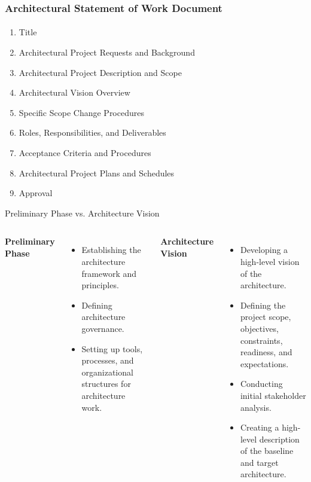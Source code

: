 \documentclass[aspectratio=169, table]{beamer}
\begin{document}
    \begin{frame}
        \frametitle{Architectural Statement of Work Document}
        \framesubtitle{\hspace{1cm}}
        \vspace{20pt}
        \begin{enumerate}
            \item Title
            \item Architectural Project Requests and Background
            \item Architectural Project Description and Scope
            \item Architectural Vision Overview
            \item Specific Scope Change Procedures
            \item Roles, Responsibilities, and Deliverables
            \item Acceptance Criteria and Procedures
            \item Architectural Project Plans and Schedules
            \item Approval
        \end{enumerate}
    \end{frame}

\begin{frame}{Preliminary Phase vs. Architecture Vision}
	\begin{columns}[t]
		\textbf{Preliminary Phase}
		\begin{itemize}
			\item Establishing the architecture framework and principles.
			\item Defining architecture governance.
			\item Setting up tools, processes, and organizational structures for architecture work.
		\end{itemize}
		
		\textbf{Architecture Vision}
		\begin{itemize}
			\item Developing a high-level vision of the architecture.
			\item Defining the project scope, objectives, constraints, readiness, and expectations.
			\item Conducting initial stakeholder analysis.
			\item Creating a high-level description of the baseline and target architecture.
		\end{itemize}
	\end{columns}
\end{frame}
\end{document}

